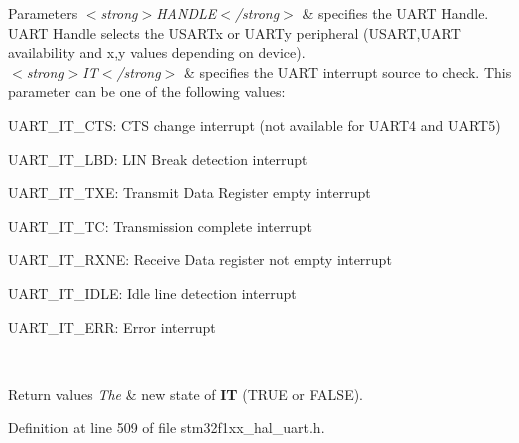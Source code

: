 \begin{DoxyParams}{Parameters}
{\em $<$strong$>$\+H\+A\+N\+D\+L\+E$<$/strong$>$} & specifies the U\+A\+RT Handle. U\+A\+RT Handle selects the U\+S\+A\+R\+Tx or U\+A\+R\+Ty peripheral (U\+S\+A\+RT,U\+A\+RT availability and x,y values depending on device). \\
\hline
{\em $<$strong$>$\+I\+T$<$/strong$>$} & specifies the U\+A\+RT interrupt source to check. This parameter can be one of the following values\+: \begin{DoxyItemize}
\item U\+A\+R\+T\+\_\+\+I\+T\+\_\+\+C\+TS\+: C\+TS change interrupt (not available for U\+A\+R\+T4 and U\+A\+R\+T5) \item U\+A\+R\+T\+\_\+\+I\+T\+\_\+\+L\+BD\+: L\+IN Break detection interrupt \item U\+A\+R\+T\+\_\+\+I\+T\+\_\+\+T\+XE\+: Transmit Data Register empty interrupt \item U\+A\+R\+T\+\_\+\+I\+T\+\_\+\+TC\+: Transmission complete interrupt \item U\+A\+R\+T\+\_\+\+I\+T\+\_\+\+R\+X\+NE\+: Receive Data register not empty interrupt \item U\+A\+R\+T\+\_\+\+I\+T\+\_\+\+I\+D\+LE\+: Idle line detection interrupt \item U\+A\+R\+T\+\_\+\+I\+T\+\_\+\+E\+RR\+: Error interrupt \end{DoxyItemize}
\\
\hline
\end{DoxyParams}

\begin{DoxyRetVals}{Return values}
{\em The} & new state of {\bfseries IT} (T\+R\+UE or F\+A\+L\+SE). \\
\hline
\end{DoxyRetVals}


Definition at line 509 of file stm32f1xx\+\_\+hal\+\_\+uart.\+h.

\mbox{\label{group___u_a_r_t___exported___macros_ga0a26cb3a576c2700f76a7c697c86a499}} 
